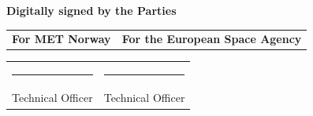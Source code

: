 \vspace*{3cm}

\begin{center}
    \textbf{Digitally signed by the Parties}
\end{center}

\vspace{3cm}

\begin{tabularx}{\textwidth}{X X}
    \centering \textbf{For MET Norway} & \centering \textbf{For the European Space Agency} \tabularnewline
\end{tabularx}

\vspace{5cm}

\begin{tabularx}{\textwidth}{X X}
    \centering \rule{6cm}{0.4pt} & \centering \rule{6cm}{0.4pt} \tabularnewline
    \centering Technical Officer & \centering Technical Officer \tabularnewline
\end{tabularx}
